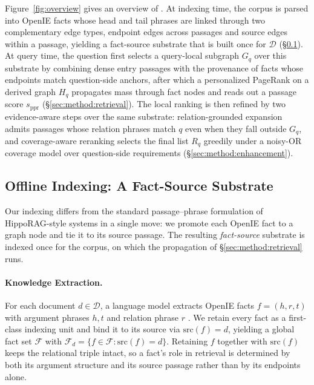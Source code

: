 Figure~\ref{fig:overview} gives an overview of \methodname{}. At
indexing time, the corpus is parsed into OpenIE facts whose head and
tail phrases are linked through two complementary edge types,
endpoint edges across passages and source edges within a passage,
yielding a fact-source substrate that is built once for $\mathcal{D}$
(\S\ref{sec:method:substrate}). At query time, the question first
selects a query-local subgraph $G_q$ over this substrate by combining
dense entry passages with the provenance of facts whose endpoints
match question-side anchors, after which a personalized PageRank on a
derived graph $H_q$ propagates mass through fact nodes and reads out
a passage score $s_{\mathrm{ppr}}$
(\S\ref{sec:method:retrieval}). The local ranking is then refined by
two evidence-aware steps over the same substrate: relation-grounded
expansion admits passages whose relation phrases match $q$ even when
they fall outside $G_q$, and coverage-aware reranking selects the
final list $R_q$ greedily under a noisy-OR coverage model over
question-side requirements (\S\ref{sec:method:enhancement}).

\subsection{Offline Indexing: A Fact-Source Substrate}
\label{sec:method:substrate}

Our indexing differs from the standard passage--phrase formulation
of HippoRAG-style systems in a single move: we promote each OpenIE
fact to a graph node and tie it to its source passage. The
resulting \emph{fact-source} substrate is indexed once for the
corpus, on which the propagation of \S\ref{sec:method:retrieval}
runs.

\paragraph{Knowledge Extraction.}
For each document $d \in \mathcal{D}$, a language model extracts
OpenIE facts $f=(h,r,t)$ with argument phrases $h, t$ and relation
phrase $r$
\citep{angeli2015leveraging,gutierrez2025hipporag}. We retain every
fact as a first-class indexing unit and bind it to its source via
$\mathrm{src}(f)=d$, yielding a global fact set $\mathcal{F}$ with
$\mathcal{F}_d = \{f\in\mathcal{F} : \mathrm{src}(f)=d\}$. Retaining
$f$ together with $\mathrm{src}(f)$ keeps the relational triple
intact, so a fact's role in retrieval is determined by both its
argument structure and its source passage rather than by its
endpoints alone.

